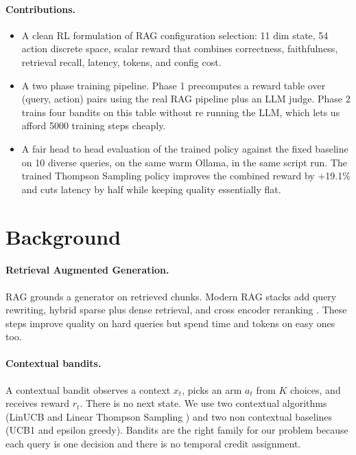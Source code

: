 \documentclass{article}
\begin{document}
\paragraph{Contributions.}
\begin{itemize}
    \item A clean RL formulation of RAG configuration selection: 11 dim state, 54 action discrete space, scalar reward that combines correctness, faithfulness, retrieval recall, latency, tokens, and config cost.
    \item A two phase training pipeline. Phase 1 precomputes a reward table over (query, action) pairs using the real RAG pipeline plus an LLM judge. Phase 2 trains four bandits on this table without re running the LLM, which lets us afford 5000 training steps cheaply.
    \item A fair head to head evaluation of the trained policy against the fixed baseline on 10 diverse queries, on the same warm Ollama, in the same script run. The trained Thompson Sampling policy improves the combined reward by +19.1\% and cuts latency by half while keeping quality essentially flat.
\end{itemize}

\section{Background}

\paragraph{Retrieval Augmented Generation.} RAG \citep{lewis2020rag} grounds a generator on retrieved chunks. Modern RAG stacks add query rewriting, hybrid sparse plus dense retrieval, and cross encoder reranking \citep{nogueira2019passage,karpukhin2020dpr,robertson2009bm25}. These steps improve quality on hard queries but spend time and tokens on easy ones too.

\paragraph{Contextual bandits.} A contextual bandit \citep{li2010contextual} observes a context $x_t$, picks an arm $a_t$ from $K$ choices, and receives reward $r_t$. There is no next state. We use two contextual algorithms (LinUCB \citep{li2010contextual} and Linear Thompson Sampling \citep{agrawal2013thompson}) and two non contextual baselines (UCB1 \citep{auer2002finite} and epsilon greedy). Bandits are the right family for our problem because each query is one decision and there is no temporal credit assignment.
\end{document}
